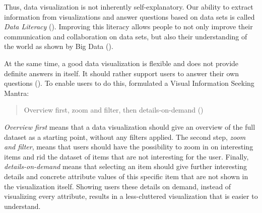 Thus, data visualization is not inherently self-explanatory. Our ability to extract information from visualizations and answer questions based on data sets is called \emph{Data Literacy} (\cite{boyPrincipledWayAssessing2014}). Improving this literacy allows people to not only improve their communication and collaboration on data sets, but also their understanding of the world as shown by Big Data (\cite{bornerDataVisualizationLiteracy2019}).

At the same time, a good data visualization is flexible and does not provide definite answers in itself. It should rather support users to answer their own questions (\cite{light2001portable}). To enable users to do this, \citeauthor{shneidermanEyesHaveIt1996} formulated a Visual Information Seeking Mantra:

\begin{quote}
    Overview first, zoom and filter, then details-on-demand (\cite[337]{shneidermanEyesHaveIt1996})
\end{quote}

\emph{Overview first} means that a data visualization should give an overview of the full dataset as a starting point, without any filters applied. The second step, \emph{zoom and filter}, means that users should have the possibility to zoom in on interesting items and rid the dataset of items that are not interesting for the user. Finally, \emph{details-on-demand} means that selecting an item should give further interesting details and concrete attribute values of this specific item that are not shown in the visualization itself. Showing users these details on demand, instead of visualizing every attribute, results in a less-cluttered visualization that is easier to understand.

